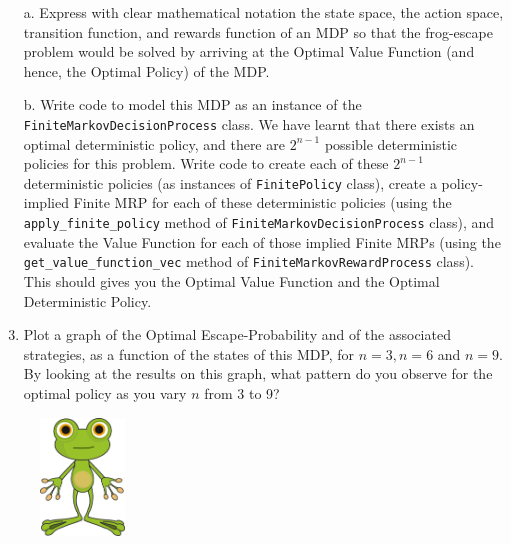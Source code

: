 \documentclass[12pt]{exam}
\begin{document}
\begin{questions}
\begin{enumerate}
	\item[a.] Express with clear mathematical notation the state space, the action space, transition function, and rewards function of an MDP so that the frog-escape problem would be solved by arriving at the Optimal Value Function (and hence, the Optimal Policy) of the MDP.
	\item[b.] Write code to model this MDP as an instance of the \lstinline{FiniteMarkovDecisionProcess} class. We have learnt that there exists an optimal deterministic policy, and there are $2^{n-1}$ possible deterministic policies for this problem. Write code to create each of these $2^{n-1}$ deterministic policies (as instances of \lstinline{FinitePolicy} class), create a policy-implied Finite MRP for each of these deterministic policies (using the \lstinline{apply_finite_policy} method of \lstinline{FiniteMarkovDecisionProcess} class), and evaluate the Value Function for each of those implied Finite MRPs (using the \lstinline{get_value_function_vec} method of \lstinline{FiniteMarkovRewardProcess} class). This should gives you the Optimal Value Function and the Optimal Deterministic Policy.
	\item[c.] Plot a graph of the Optimal Escape-Probability and of the associated strategies, as a function of the states of this MDP, for $n=3, n=6$ and $n=9$. By looking at the results on this graph, what pattern do you observe for the optimal policy as you vary $n$ from 3 to 9? 
\end{enumerate}

\end{questions}

\begin{figure}[b]
	\begin{center}
		\includegraphics[width=0.2\textwidth]{Figures/2_frog.png}
	\end{center}
\end{figure}
\end{document}
